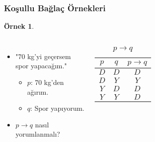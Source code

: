 \documentclass[dvipsnames]{beamer}
\theoremstyle{definition}
\theoremstyle{example}
\newtheorem{ornek}[theorem]{Örnek}
\theoremstyle{plain}
\begin{document}
\begin{frame}
  \frametitle{Koşullu Bağlaç Örnekleri}

  \begin{ornek}
    \begin{columns}
      \begin{itemize}
        \item "70 kg'yi geçersem spor yapacağım."
        \begin{itemize}
          \item $p$: 70 kg'den ağırım.
          \item $q$: Spor yapıyorum.
        \end{itemize}

        \pause
        \item $p \rightarrow q$ nasıl yorumlanmalı?
      \end{itemize}

      \begin{table}
        \caption{$p \rightarrow q$}
        \begin{tabular}{|c|c||c|}\hline
          $p$ & $q$ & $p \rightarrow q$\\\hline\hline
          $D$ & $D$ & $D$              \\\hline
          $D$ & $Y$ & $Y$              \\\hline
          $Y$ & $D$ & $D$              \\\hline
          $Y$ & $Y$ & $D$              \\\hline
        \end{tabular}
      \end{table}
    \end{columns}
  \end{ornek}
\end{frame}
\end{document}
